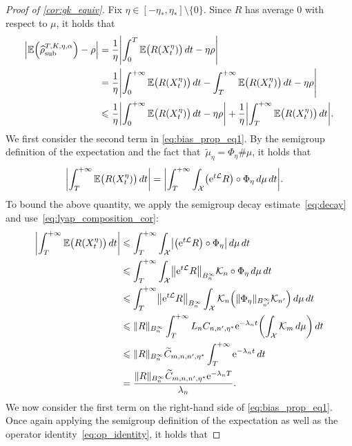 \documentclass[11pt]{article}
\newcommand{\E}{\mathbb{E}}
\newcommand{\e}{\mathrm{e}}
\renewcommand{\L}{\mathcal{L}}
\renewcommand{\leq}{\leqslant}
\DeclarePairedDelimiter\abs{\lvert}{\rvert}
\DeclarePairedDelimiter\norm{\lVert}{\rVert}
\DeclarePairedDelimiter\paren{\lparen}{\rparen}
\theoremstyle{definition}
\newcommand{\psip}{\widetilde{\mu}_\eta}
\newcommand{\estTmp}{\widehat{\rho}}
\newcommand{\aTSest}{\estTmp^{T,K,\eta,\alpha}_{\rm sub}} %
\begin{document}
\begin{proof}[Proof of \cref{cor:gk_equiv}]
	Fix $\eta \in [-\eta_*, \eta_*] \setminus \{0\}$. Since $R$ has average 0 with respect to $\mu$, it holds that
\begin{align}
\left|\E\paren*{\aTSest} - \rho\right| &= \frac{1}{\eta}\Biggl|\int_0^T \E\bigl(R(X^\eta_t)\bigr) \, dt - \eta\rho\Biggr| \\
&= \frac{1}{\eta}\Biggl|\int_0^{+\infty} \E\bigl(R(X^\eta_t)\bigr) \, dt - \int_T^{+\infty} \E\bigl(R(X^\eta_t)\bigr) \, dt - \eta\rho\Biggr| \\
&\leq \frac{1}{\eta}\abs*{\int_0^{+\infty} \E\bigl(R(X^\eta_t)\bigr) \, dt - \eta\rho} + \frac{1}{\eta}\abs*{\int_T^{+\infty} \E\bigl(R(X^\eta_t)\bigr) \, dt}.
\label{eq:bias_prop_eq1}
\end{align}
We first consider the second term in \eqref{eq:bias_prop_eq1}. By the semigroup definition of the expectation and the fact that~$\psip = \Phi_\eta\#\mu$, it holds that
\begin{align}
		\abs*{\int_T^{+\infty} \E\bigl(R(X^\eta_t)\bigr) \, dt} &= \abs*{\int_T^{+\infty} \int_\mathcal{X} \bigl(\e^{t\L} R\bigr) \circ \Phi_\eta \, d\mu \, dt}.
		\label{eq:trunc_bias_eq}
\end{align}
To bound the above quantity, we apply the semigroup decay estimate~\eqref{eq:decay} and use~\eqref{eq:lyap_composition_cor}: 
\begin{align}
		\abs*{\int_T^{+\infty} \E\bigl(R(X^\eta_t)\bigr) \, dt} &\leq \int_T^{+\infty} \int_\mathcal{X} \abs*{\bigl(\e^{t\L} R\bigr) \circ \Phi_\eta} \, d\mu \, dt \\
		&\leq \int_T^{+\infty} \int_\mathcal{X} \norm*{\e^{t\L} R}_{B^\infty_n} \mathcal{K}_n \circ \Phi_\eta \, d\mu \, dt \\
		&\leq \int_T^{+\infty} \norm*{\e^{t\L} R}_{B^\infty_n} \int_\mathcal{X} \mathcal{K}_n\paren*{\norm{\Phi_\eta}_{B^\infty_{n'}} \mathcal{K}_{n'}} \, d\mu \, dt \\
		&\leq \norm{R}_{B^\infty_n}\int_T^{+\infty} L_n C_{n,n',\eta^*} \e^{-\lambda_n t} \paren*{\int_\mathcal{X} \mathcal{K}_m \, d\mu} \, dt \\
		&\leq \norm{R}_{B^\infty_n}\widetilde{C}_{m,n,n',\eta^*}\int_T^{+\infty} \e^{-\lambda_n t} \, dt \\
  &= \frac{\norm{R}_{B^\infty_n}\widetilde{C}_{m,n,n',\eta^*}\e^{-\lambda_n T}}{\lambda_n}. \end{align}
We now consider the first term on the right-hand side of \eqref{eq:bias_prop_eq1}. 
Once again applying the semigroup definition of the expectation as well as the operator identity~\eqref{eq:op_identity}, it holds that

\end{proof}
\end{document}
